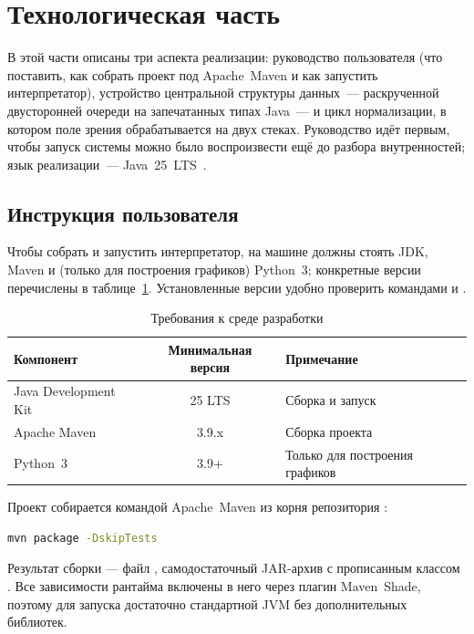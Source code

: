 \section{Технологическая часть}
\label{sec:tech}

В этой части описаны три аспекта реализации: руководство пользователя (что поставить,
как собрать проект под Apache~Maven и как запустить интерпретатор), устройство
центральной структуры данных~--- раскрученной двусторонней очереди на запечатанных
типах Java~--- и цикл нормализации, в котором поле зрения обрабатывается на двух
стеках. Руководство идёт первым, чтобы запуск системы можно было воспроизвести ещё
до разбора внутренностей; язык реализации~--- Java~25~LTS~\cite{java_se25_spec}.

\subsection{Инструкция пользователя}
\label{subsec:user-manual}

Чтобы собрать и запустить интерпретатор, на машине должны стоять JDK, Maven и (только для
построения графиков) Python~3; конкретные версии перечислены в
таблице~\ref{tab:requirements}. Установленные версии удобно проверить командами
 и .

\begin{table}[!htb]
\caption{\centering Требования к среде разработки}
\label{tab:requirements}
\centering
\small
\begin{tabular}{|l|c|l|}
\hline
\textbf{Компонент} & \textbf{Минимальная версия} & \textbf{Примечание} \\
\hline
Java Development Kit & 25 LTS & Сборка и запуск \\
\hline
Apache Maven & 3.9.x & Сборка проекта \\
\hline
Python~3 & 3.9+ & Только для построения графиков \\
\hline
\end{tabular}
\end{table}

Проект собирается командой Apache~Maven из корня репозитория :

\begin{lstlisting}[language=bash,caption={Команда сборки},label={lst:build}]
mvn package -DskipTests
\end{lstlisting}

Результат сборки --- файл , самодостаточный
JAR-архив с прописанным классом .
Все зависимости рантайма включены в него через плагин Maven~Shade,
поэтому для запуска достаточно стандартной JVM без дополнительных библиотек.

